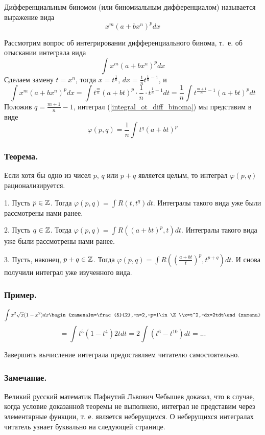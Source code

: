 \opred
Дифференциальным биномом (или биномиальным дифференциалом) называется выражение вида
$$x^m(a+bx^n)^p dx$$

Рассмотрим вопрос об интегрировании дифференциального бинома, т.~е. об отыскании интеграла вида
\begin{equation}\label{integral_ot_diff_binoma}
\int x^m(a+bx^n)^p dx
\end{equation}
Сделаем замену $t=x^n$, тогда $x=t^{\frac{1}{n}}$, $dx=\frac{1}{n}t^{\frac{1}{n}-1}$, и 
$$
\int x^m(a+bx^n)^p dx=
\int t^{\frac{m}{n}}(a+bt)^p\cdot \frac{1}{n}\cdot t^{\frac{1}{n}-1}dt=
\frac{1}{n}\int t^{\frac{m+1}{n}-1}(a+bt)^p dt
$$
Положив $q=\frac{m+1}{n}-1$, интеграл (\ref{integral_ot_diff_binoma}) мы представим в виде
$$\varphi(p,q)=\frac{1}{n}\int t^q(a+bt)^p$$

\subsubsection{Теорема.}
Если хотя бы одно из чисел $p$, $q$ или $p+q$ является целым, то интеграл $\varphi(p,q)$ рационализируется.

\dokvo

1. Пусть $p\in\mathbb{Z}$. Тогда $\varphi(p,q)=\int R(t,t^q)dt$. Интегралы такого вида уже были рассмотрены нами ранее.

2. Пусть $q\in\mathbb{Z}$. Тогда $\varphi(p,q)=\int R((a+bt)^p,t)dt$. Интегралы такого вида уже были рассмотрены нами ранее.

3. Пусть, наконец, $p+q\in\mathbb{Z}$. Тогда $\varphi(p,q)=\int R\left(\left(\frac{a+bt}{t}\right)^p,t^{p+q}\right)dt$. И снова получили интеграл уже изученного вида.

\dokno

\subsubsection{Пример.}
$$\int x^2 \sqrt{x}(1-x^2)dx\begin{zamena}m=\frac{5}{2},~n=2,~p=1\in\Z\\x=t^2,~dx=2tdt\end{zamena}$$$$=
\int t^5(1-t^4)2tdt=2\int (t^6-t^{10}) dt=...$$

Завершить вычисление интеграла предоставляем читателю самостоятельно.

\subsubsection{Замечание.}
Великий русский математик Пафнутий Львович Чебышев доказал, что в случае, когда условие  доказанной теоремы не выполнено, интеграл не представим через элементарные функции, т. е. является неберущимся. О неберущихся интегралах читатель узнает буквально на следующей странице.
